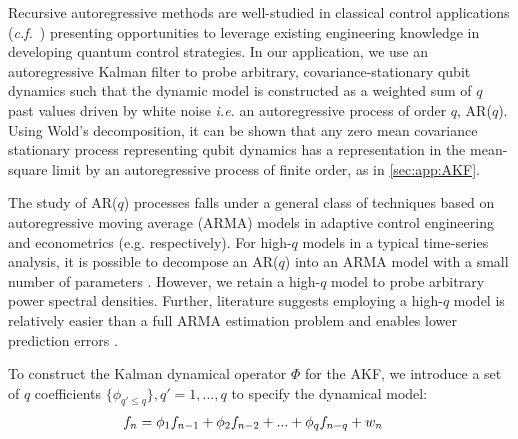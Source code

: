 Recursive autoregressive methods are well-studied in classical control applications  (\emph{c.f.}~\cite{moon2006real}) presenting opportunities to leverage existing engineering knowledge in developing quantum control strategies.  In our application, we use an autoregressive Kalman filter to probe arbitrary, covariance-stationary qubit dynamics such that the dynamic model is constructed as a weighted sum of $q$ past values driven by white noise {\em i.e.} an autoregressive process of order $q$, AR($q$). Using Wold's decomposition, it can be shown that any zero mean covariance stationary process representing qubit dynamics has a representation in the mean-square limit by an autoregressive process of finite order, as in \cref{sec:app:AKF}.

The study of AR($q$) processes falls under a general class of techniques based on autoregressive moving average (ARMA) models in adaptive control engineering and econometrics (e.g.  \cite{landau1998adaptive,hamilton1994time} respectively). For high-$q$ models in a typical time-series analysis, it is possible to decompose an AR($q$) into an ARMA model with a small number of parameters \cite{brockwell1996introduction, salzmann1991detection}. However, we retain a high-$q$ model to probe arbitrary power spectral densities. Further, literature suggests employing a high-$q$ model is relatively easier than a full ARMA estimation problem and enables lower prediction errors \cite{wahlberg1989estimation,brockwell1996introduction}. 

To construct the Kalman dynamical operator $\Phi$ for the AKF, we introduce a
set of $q$ coefficients $\{\phi_{q' \leq q}\}, q' = 1, ... , q $ to specify the dynamical model:
\begin{align}
 f_n &= \phi_1 f_{n-1} + \phi_2 f_{n-2} + ... + \phi_q f_{n-q} + w_n \label{eqn:main:ARprocess}
\end{align}

